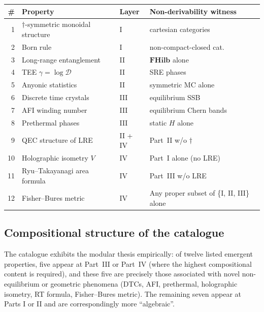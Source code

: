 \documentclass[12pt]{article}
\theoremstyle{definition}
\theoremstyle{remark}
\newcommand{\FHilb}{\mathbf{FHilb}}
\begin{document}
\begin{center}
\small
\renewcommand{\arraystretch}{1.18}
\begin{tabular}{@{}rlll@{}}
\toprule
\# & Property & Layer & Non-derivability witness \\
\midrule
1 & $\dagger$-symmetric monoidal structure       & I       & cartesian categories \\
2 & Born rule                                    & I       & non-compact-closed cat. \\
3 & Long-range entanglement                      & II      & $\FHilb$ alone \\
4 & TEE $\gamma = \log \mathcal{D}$              & II      & SRE phases \\
5 & Anyonic statistics                           & II      & symmetric MC alone \\
6 & Discrete time crystals                       & III     & equilibrium SSB \\
7 & AFI winding number                           & III     & equilibrium Chern bands \\
8 & Prethermal phases                            & III     & static $H$ alone \\
9 & QEC structure of LRE                         & II + IV & Part~II w/o $\dagger$ \\
10 & Holographic isometry $V$                    & IV      & Part~I alone (no LRE) \\
11 & Ryu--Takayanagi area formula                & IV      & Part~III w/o LRE \\
12 & Fisher--Bures metric                        & IV      & Any proper subset of \{I, II, III\} alone \\
\bottomrule
\end{tabular}
\end{center}

\subsection{Compositional structure of the catalogue}

The catalogue exhibits the modular thesis empirically: of twelve listed
emergent properties, five appear at Part~III or Part~IV (where the highest
compositional content is required), and these five are precisely those
associated with novel non-equilibrium or geometric phenomena (DTCs, AFI,
prethermal, holographic isometry, RT formula, Fisher--Bures metric). The
remaining seven appear at Parts I or II and are correspondingly more
``algebraic''.
\end{document}
